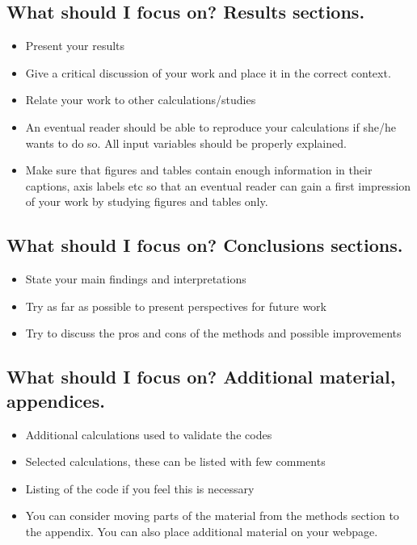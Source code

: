 \documentclass[10pt]{article}
\begin{document}
\subsection*{What should I focus on? Results sections.}
\begin{itemize}
\item Present your results
\item Give a critical discussion of your work and place it in the correct context.
\item Relate your work to other calculations/studies
\item An eventual reader should be able to reproduce your calculations if she/he wants to do so. All input variables should be properly explained.
\item Make sure that figures and tables contain enough information in their captions, axis labels etc so that an eventual reader can gain a first impression of your work by studying figures and tables only.
\end{itemize}

\subsection*{What should I focus on? Conclusions sections.}
\begin{itemize}
\item State your main findings and interpretations
\item Try as far as possible to present perspectives for future work
\item Try to discuss the pros and cons of the methods and possible improvements
\end{itemize}

\subsection*{What should I focus on? Additional material, appendices.}
\begin{itemize}
\item Additional calculations used to validate the codes
\item Selected calculations, these can be listed with few comments
\item Listing of the code if you feel this is necessary
\item You can consider moving parts of the material from the methods section to the appendix. You can also place additional material on your webpage.
\end{itemize}
\end{document}
